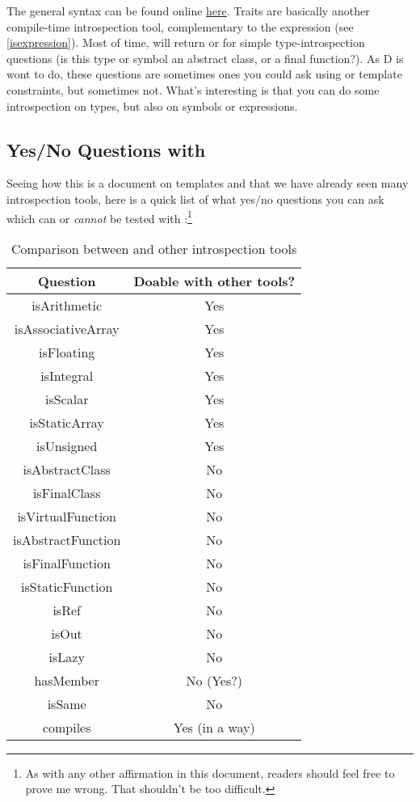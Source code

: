 The general  syntax can be found online \href{www.dlang.org/traits.html}{here}. Traits are basically another compile-time introspection tool, complementary to the  expression (see  \autoref{isexpression}). Most of time,  will return  or  for simple type-introspection questions (is this type or symbol an abstract class, or a final function?). As D is wont to do, these questions are sometimes ones you could ask using  or template constraints, but sometimes not. What's interesting is that you can do some introspection on types, but also on symbols or expressions.

\subsection{\texorpdfstring{Yes/No Questions with }
                           {Yes/No Questions with \_\_traits}}
\label{yesnoquestionsontypes}

Seeing how this is a document on templates and that we have already seen many introspection tools, here is a quick list of what yes/no questions you can ask which can or \emph{cannot} be tested with :\footnote{As with any other affirmation in this document, readers should feel free to prove me wrong. That shouldn't be too difficult.}

\begin{table}[htb]
\centering
\begin{tabular}[c]{|c|c|}
\hline
Question & Doable with other tools? \\
\hline
\hline
isArithmetic & Yes \\
isAssociativeArray & Yes \\
isFloating & Yes \\
isIntegral & Yes \\
isScalar & Yes \\
isStaticArray & Yes \\
isUnsigned & Yes \\
\hline
\hline
isAbstractClass & No \\
isFinalClass & No \\
isVirtualFunction & No \\
isAbstractFunction & No \\
isFinalFunction & No \\
isStaticFunction & No \\
\hline
\hline
isRef & No \\
isOut & No \\
isLazy & No \\
\hline
\hline
hasMember & No (Yes?) \\
isSame & No \\
compiles & Yes (in a way) \\
\hline
\end{tabular}
\caption{Comparison between  and other introspection tools}
\label{table:traits}
\end{table}

